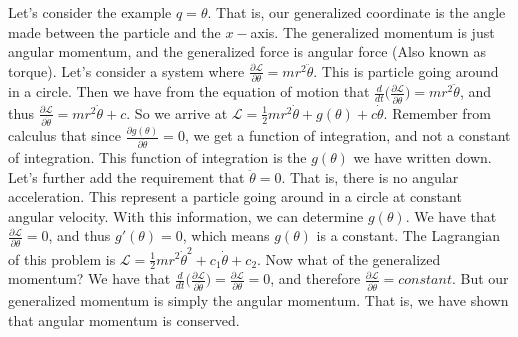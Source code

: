 \documentclass[oneside]{book}
\theoremstyle{definition}
\begin{document}
Let's consider the example $q = \theta$. That is, our generalized coordinate is the angle made between the particle and the $x-$axis. The generalized momentum is just angular momentum, and the generalized force is angular force (Also known as torque). Let's consider a system where $\frac{\partial \mathcal{L}}{\partial \theta} = mr^2 \ddot{\theta}$. This is particle going around in a circle. Then we have from the equation of motion that $\frac{d}{dt}\big(\frac{\partial \mathcal{L}}{\partial \dot{\theta}}\big) = mr^2 \ddot{\theta}$, and thus $\frac{\partial \mathcal{L}}{\partial \dot{\theta}} = mr^2\dot{\theta} +c$. So we arrive at $\mathcal{L} = \frac{1}{2}mr^2\dot{\theta} + g(\theta) + c\dot{\theta}$. Remember from calculus that since $\frac{\partial g(\theta)}{\partial \dot{\theta}} = 0$, we get a function of integration, and not a constant of integration. This function of integration is the $g(\theta)$ we have written down. Let's further add the requirement that $\ddot{\theta} = 0$. That is, there is no angular acceleration. This represent a particle going around in a circle at constant angular velocity. With this information, we can determine $g(\theta)$. We have that $\frac{\partial \mathcal{L}}{\partial \theta} = 0$, and thus $g'(\theta) = 0$, which means $g(\theta)$ is a constant. The Lagrangian of this problem is $\mathcal{L} = \frac{1}{2}mr^2 \dot{\theta}^2+ c_1 \dot{\theta}+c_2$. Now what of the generalized momentum? We have that $\frac{d}{dt}\big(\frac{\partial \mathcal{L}}{\partial \dot{\theta}}\big) = \frac{\partial \mathcal{L}}{\partial \theta} = 0$, and therefore $\frac{\partial \mathcal{L}}{\partial \dot{\theta}} = constant$. But our generalized momentum is simply the angular momentum. That is, we have shown that angular momentum is conserved.
\end{document}
